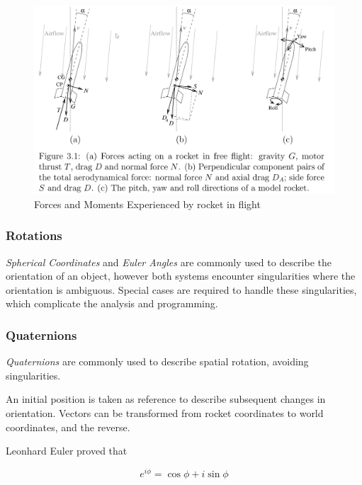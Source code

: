 \documentclass[]{article}
\begin{document}
\begin{figure}[htbp]
\centering
\includegraphics{images/rocket_flight_forces_moments.png}
\caption{Forces and Moments Experienced by rocket in flight
\label{img_rocket_flight_forces_moments_label}}
\end{figure}

\clearpage

\subsubsection{Rotations}\label{rotations}

\emph{Spherical Coordinates} and \emph{Euler Angles} are commonly used
to describe the orientation of an object, however both systems encounter
singularities where the orientation is ambiguous. Special cases are
required to handle these singularities, which complicate the analysis
and programming.

\subsubsection{Quaternions}\label{quaternions}

\emph{Quaternions} are commonly used to describe spatial rotation,
avoiding singularities.

An initial position is taken as reference to describe subsequent changes
in orientation. Vectors can be transformed from rocket coordinates to
world coordinates, and the reverse.

Leonhard Euler proved that

\begin{equation}
\label{eq_euler_mult}
e^{i\phi} = \cos \phi + i \sin \phi
\end{equation}
\end{document}
